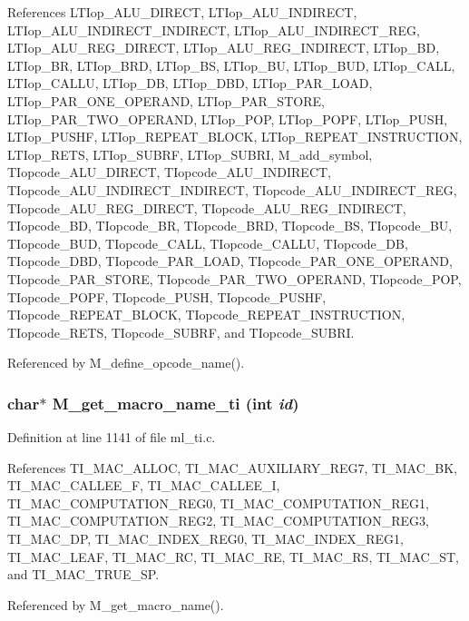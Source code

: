 References LTIop\_\-ALU\_\-DIRECT, LTIop\_\-ALU\_\-INDIRECT, LTIop\_\-ALU\_\-INDIRECT\_\-INDIRECT, LTIop\_\-ALU\_\-INDIRECT\_\-REG, LTIop\_\-ALU\_\-REG\_\-DIRECT, LTIop\_\-ALU\_\-REG\_\-INDIRECT, LTIop\_\-BD, LTIop\_\-BR, LTIop\_\-BRD, LTIop\_\-BS, LTIop\_\-BU, LTIop\_\-BUD, LTIop\_\-CALL, LTIop\_\-CALLU, LTIop\_\-DB, LTIop\_\-DBD, LTIop\_\-PAR\_\-LOAD, LTIop\_\-PAR\_\-ONE\_\-OPERAND, LTIop\_\-PAR\_\-STORE, LTIop\_\-PAR\_\-TWO\_\-OPERAND, LTIop\_\-POP, LTIop\_\-POPF, LTIop\_\-PUSH, LTIop\_\-PUSHF, LTIop\_\-REPEAT\_\-BLOCK, LTIop\_\-REPEAT\_\-INSTRUCTION, LTIop\_\-RETS, LTIop\_\-SUBRF, LTIop\_\-SUBRI, M\_\-add\_\-symbol, TIopcode\_\-ALU\_\-DIRECT, TIopcode\_\-ALU\_\-INDIRECT, TIopcode\_\-ALU\_\-INDIRECT\_\-INDIRECT, TIopcode\_\-ALU\_\-INDIRECT\_\-REG, TIopcode\_\-ALU\_\-REG\_\-DIRECT, TIopcode\_\-ALU\_\-REG\_\-INDIRECT, TIopcode\_\-BD, TIopcode\_\-BR, TIopcode\_\-BRD, TIopcode\_\-BS, TIopcode\_\-BU, TIopcode\_\-BUD, TIopcode\_\-CALL, TIopcode\_\-CALLU, TIopcode\_\-DB, TIopcode\_\-DBD, TIopcode\_\-PAR\_\-LOAD, TIopcode\_\-PAR\_\-ONE\_\-OPERAND, TIopcode\_\-PAR\_\-STORE, TIopcode\_\-PAR\_\-TWO\_\-OPERAND, TIopcode\_\-POP, TIopcode\_\-POPF, TIopcode\_\-PUSH, TIopcode\_\-PUSHF, TIopcode\_\-REPEAT\_\-BLOCK, TIopcode\_\-REPEAT\_\-INSTRUCTION, TIopcode\_\-RETS, TIopcode\_\-SUBRF, and TIopcode\_\-SUBRI.

Referenced by M\_\-define\_\-opcode\_\-name().
\subsubsection{\setlength{\rightskip}{0pt plus 5cm}char$\ast$ M\_\-get\_\-macro\_\-name\_\-ti (int {\em id})}\label{m__ti_8h_1253c117d601ea643a109dc732cc72a8}




Definition at line 1141 of file ml\_\-ti.c.

References TI\_\-MAC\_\-ALLOC, TI\_\-MAC\_\-AUXILIARY\_\-REG7, TI\_\-MAC\_\-BK, TI\_\-MAC\_\-CALLEE\_\-F, TI\_\-MAC\_\-CALLEE\_\-I, TI\_\-MAC\_\-COMPUTATION\_\-REG0, TI\_\-MAC\_\-COMPUTATION\_\-REG1, TI\_\-MAC\_\-COMPUTATION\_\-REG2, TI\_\-MAC\_\-COMPUTATION\_\-REG3, TI\_\-MAC\_\-DP, TI\_\-MAC\_\-INDEX\_\-REG0, TI\_\-MAC\_\-INDEX\_\-REG1, TI\_\-MAC\_\-LEAF, TI\_\-MAC\_\-RC, TI\_\-MAC\_\-RE, TI\_\-MAC\_\-RS, TI\_\-MAC\_\-ST, and TI\_\-MAC\_\-TRUE\_\-SP.

Referenced by M\_\-get\_\-macro\_\-name().
